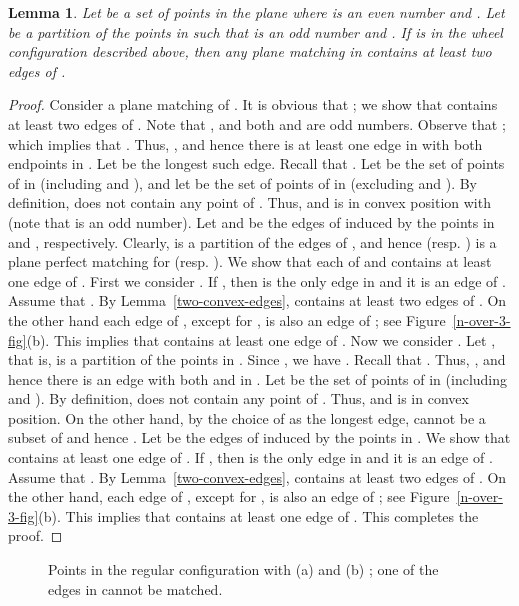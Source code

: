\documentclass[11pt,a4paper]{article}
\newcommand{\CH}[1]{\text{}}
\newtheorem{lemma}{Lemma}
\begin{document}
\begin{lemma}
\label{two-wheel-edges}
 Let  be a set of points in the plane where  is an even number and . Let  be a partition of the points in   such that  is an odd number and . If  is in the wheel configuration described above, then any plane matching in  contains at least two edges of \CH{P}.
\end{lemma}
\begin{proof}
 Consider a plane matching  of . It is obvious that ; we show that  contains at least two edges of . Note that , and both  and  are odd numbers. Observe that ; which implies that . Thus, , and hence there is at least one edge in  with both endpoints in . Let  be the longest such edge. Recall that . Let  be the set of points of  in  (including  and ), and let  be the set of points of  in  (excluding  and ). By definition,  does not contain any point of . Thus,  and  is in convex position with  (note that  is an odd number). Let  and  be the edges of  induced by the points in  and , respectively. Clearly,  is a partition of the edges of , and hence  (resp. ) is a plane perfect matching for  (resp. ). We show that each of  and  contains at least one edge of \CH{X}. First we consider . If , then  is the only edge in  and it is an edge of \CH{X}. Assume that . By Lemma~\ref{two-convex-edges},  contains at least two edges of \CH{A}. On the other hand each edge of \CH{A}, except for , is also an edge of \CH{X}; see Figure~\ref{n-over-3-fig}(b). This implies that  contains at least one edge of \CH{X}. Now we consider . Let , that is,  is a partition of the points in . Since , we have . Recall that . Thus, , and hence there is an edge  with both  and  in . Let  be the set of points of  in  (including  and ). By definition,  does not contain any point of . Thus,  and  is in convex position. On the other hand, by the choice of  as the longest edge,  cannot be a subset of  and hence . Let   be the edges of  induced by the points in . We show that  contains at least one edge of \CH{X}. If , then  is the only edge in  and it is an edge of \CH{X}. Assume that . By Lemma~\ref{two-convex-edges},  contains at least two edges of \CH{B}. On the other hand, each edge of \CH{B}, except for , is also an edge of \CH{X}; see Figure~\ref{n-over-3-fig}(b). This implies that  contains at least one edge of \CH{X}. This completes the proof. 
\end{proof}

\begin{figure}[htb]
  \centering
\setlength{\tabcolsep}{0in}
  
  \caption{Points in the regular configuration with (a)  and (b) ; one of the edges in \CH{P} cannot be matched.}
\label{wheel-fig}
\end{figure}
\end{document}
